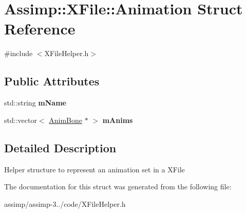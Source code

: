 \hypertarget{struct_assimp_1_1_x_file_1_1_animation}{\section{Assimp\+:\+:X\+File\+:\+:Animation Struct Reference}
\label{struct_assimp_1_1_x_file_1_1_animation}
}


{\ttfamily \#include $<$X\+File\+Helper.\+h$>$}

\subsection*{Public Attributes}
\begin{DoxyCompactItemize}
\item 
\hypertarget{struct_assimp_1_1_x_file_1_1_animation_a9d5c5c86d417fcd9a1839a37aa8fb01e}{std\+::string {\bfseries m\+Name}}\label{struct_assimp_1_1_x_file_1_1_animation_a9d5c5c86d417fcd9a1839a37aa8fb01e}

\item 
\hypertarget{struct_assimp_1_1_x_file_1_1_animation_a1b01bc5b839f604ade06119cf1ddccad}{std\+::vector$<$ \hyperlink{struct_assimp_1_1_x_file_1_1_anim_bone}{Anim\+Bone} $\ast$ $>$ {\bfseries m\+Anims}}\label{struct_assimp_1_1_x_file_1_1_animation_a1b01bc5b839f604ade06119cf1ddccad}

\end{DoxyCompactItemize}


\subsection{Detailed Description}
Helper structure to represent an animation set in a X\+File 

The documentation for this struct was generated from the following file\+:\begin{DoxyCompactItemize}
\item 
assimp/assimp-\/3../code/X\+File\+Helper.\+h\end{DoxyCompactItemize}
